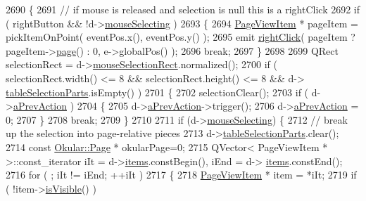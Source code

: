 \begin{DoxyCode}
{{2690         \{
2691             \textcolor{comment}{// if mouse is released and selection is null this is a rightClick}
2692             \textcolor{keywordflow}{if} ( rightButton && !d->\hyperlink{classPageViewPrivate_a8819b152a8279b75359af2a3e0567681}{mouseSelecting} )
2693             \{
2694                 \hyperlink{classPageViewItem}{PageViewItem} * pageItem = pickItemOnPoint( eventPos.x(), eventPos.y() );
2695                 emit \hyperlink{classPageView_a51ac8814a8f47fd02ac0b61627ad164f}{rightClick}( pageItem ? pageItem->\hyperlink{classPageViewItem_a5c512d95e5563e8d19d1fb3d93dafc31}{page}() : 0, e->globalPos() );
2696                 \textcolor{keywordflow}{break};
2697             \}
2698 
2699             QRect selectionRect = d->\hyperlink{classPageViewPrivate_a94473cb593838a977bea89214bd1ef66}{mouseSelectionRect}.normalized();
2700             \textcolor{keywordflow}{if} ( selectionRect.width() <= 8 && selectionRect.height() <= 8 && d->
      \hyperlink{classPageViewPrivate_aec476c0b74867740803d4ba34393b154}{tableSelectionParts}.isEmpty() )
2701             \{
2702                 selectionClear();
2703                 \textcolor{keywordflow}{if} ( d->\hyperlink{classPageViewPrivate_a63b5ccd8ed0f4ac9a89c040aeb3173a9}{aPrevAction} )
2704                 \{
2705                     d->\hyperlink{classPageViewPrivate_a63b5ccd8ed0f4ac9a89c040aeb3173a9}{aPrevAction}->trigger();
2706                     d->\hyperlink{classPageViewPrivate_a63b5ccd8ed0f4ac9a89c040aeb3173a9}{aPrevAction} = 0;
2707                 \}
2708                 \textcolor{keywordflow}{break};
2709             \}
2710 
2711             \textcolor{keywordflow}{if} (d->\hyperlink{classPageViewPrivate_a8819b152a8279b75359af2a3e0567681}{mouseSelecting}) \{
2712                 \textcolor{comment}{// break up the selection into page-relative pieces}
2713                 d->\hyperlink{classPageViewPrivate_aec476c0b74867740803d4ba34393b154}{tableSelectionParts}.clear();
2714                 \textcolor{keyword}{const} \hyperlink{classOkular_1_1Page}{Okular::Page} * okularPage=0;
2715                 QVector< PageViewItem * >::const\_iterator iIt = d->\hyperlink{classPageViewPrivate_ad90c795dead9abfaa5818a94e00435bc}{items}.constBegin(), iEnd = d->
      \hyperlink{classPageViewPrivate_ad90c795dead9abfaa5818a94e00435bc}{items}.constEnd();
2716                 \textcolor{keywordflow}{for} ( ; iIt != iEnd; ++iIt )
2717                 \{
2718                     \hyperlink{classPageViewItem}{PageViewItem} * item = *iIt;
2719                     \textcolor{keywordflow}{if} ( !item->\hyperlink{classPageViewItem_ae7a4dfa618d0cb56e01075842c67bf9f}{isVisible}() )
}}
\end{DoxyCode}
